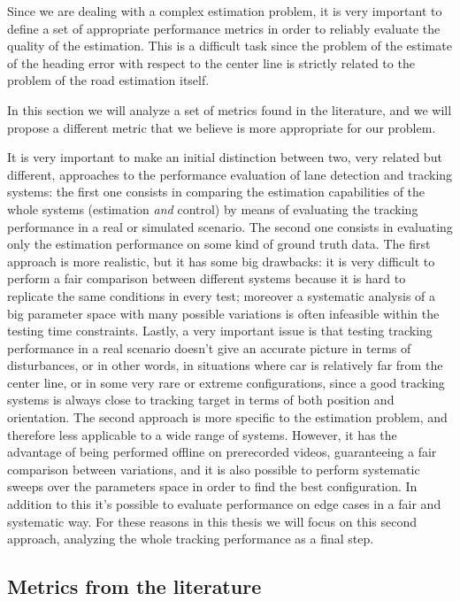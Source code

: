 \documentclass[a4paper,12pt,sort&compress]{article}
\begin{document}
    Since we are dealing with a complex estimation problem, it is very important to define a set of
    appropriate performance metrics in order to reliably evaluate the quality of the estimation.
    This is a difficult task since the problem of the estimate of the heading error with respect to
    the center line is strictly related to the problem of the road estimation itself. 

    In this section we will analyze a set of metrics found in the literature, and we will propose a
    different metric that we believe is more appropriate for our problem. 

    It is very important to make an initial distinction between two, very related but
    different, approaches to the performance evaluation of lane detection and tracking systems: the
    first one consists in comparing the estimation capabilities of the whole systems (estimation
    \textit{and} control) by means of evaluating the tracking performance in a real or simulated
    scenario. The second one consists in evaluating only the estimation performance on some kind of
    ground truth data. The first approach is more realistic, but it has some big drawbacks: it is
    very difficult to perform a fair comparison between different systems because it is hard to
    replicate the same conditions in every test; moreover a systematic analysis of a big parameter
    space with many possible variations is often infeasible within the testing time constraints.
    Lastly, a very important issue is that testing tracking performance in a real scenario doesn't
    give an accurate picture in terms of disturbances, or in other words, in situations where car is
    relatively far from the center line, or in some very rare or extreme configurations, since a
    good tracking systems is always close to tracking target in terms of both position and orientation. 
    The second approach is more specific to the estimation problem, and therefore less applicable to
    a wide range of systems. However, it has the advantage of being performed offline on prerecorded
    videos, guaranteeing a fair comparison between variations, and it is also possible to perform
    systematic sweeps over the parameters space in order to find the best configuration. In addition
    to this it's possible to evaluate performance on edge cases in a fair and systematic way.  For these
    reasons in this thesis we will focus on this second approach, analyzing the whole tracking
    performance as a final step.

    \subsection{Metrics from the literature}
\end{document}
